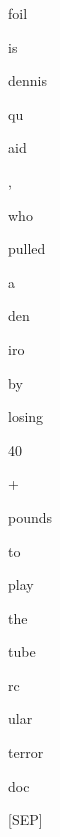 \documentclass[varwidth=150mm]{standalone}
\begin{document}
\begin{CJK*}{UTF8}{gbsn}
{{{\colorbox{red!0.0}{\strut foil} \colorbox{red!9.849358558654785}{\strut is} \colorbox{red!3.4178593158721924}{\strut dennis} \colorbox{red!1.5999245643615723}{\strut qu}\colorbox{red!5.3049139976501465}{\strut aid} \colorbox{red!0.0}{\strut ,} \colorbox{red!1.8785548210144043}{\strut who} \colorbox{red!0.0}{\strut pulled} \colorbox{red!0.0}{\strut a} \colorbox{red!3.5216214656829834}{\strut den}\colorbox{red!3.2044312953948975}{\strut iro} \colorbox{red!0.0}{\strut by} \colorbox{red!0.0}{\strut losing} \colorbox{red!0.0}{\strut 40} \colorbox{red!2.7703349590301514}{\strut +} \colorbox{red!7.691236972808838}{\strut pounds} \colorbox{red!2.6133954524993896}{\strut to} \colorbox{red!19.907028198242188}{\strut play} \colorbox{red!22.188365936279297}{\strut the} \colorbox{red!1.9934420585632324}{\strut tube}\colorbox{red!3.2377846240997314}{\strut rc}\colorbox{red!4.072986602783203}{\strut ular} \colorbox{red!18.043607711791992}{\strut terror} \colorbox{red!39.616920471191406}{\strut doc} \colorbox{red!1.768447995185852}{\strut [SEP]}
}}}
\end{CJK*}
\end{document}
